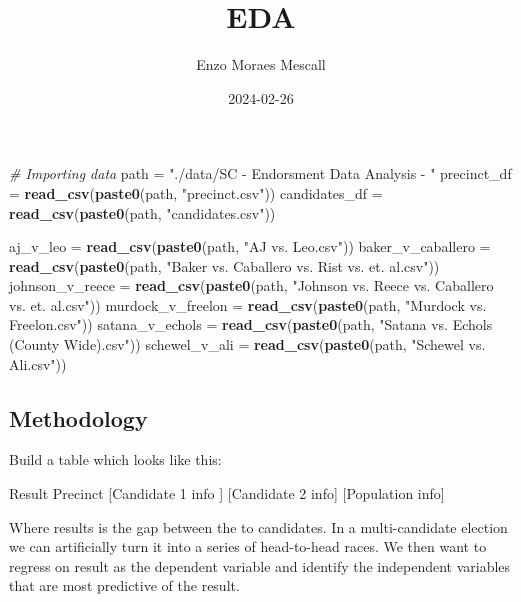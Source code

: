 \documentclass[
]{article}
\title{EDA}
\author{Enzo Moraes Mescall}
\date{2024-02-26}
\newenvironment{Shaded}{\begin{snugshade}}{\end{snugshade}}
\newcommand{\CommentTok}[1]{\textcolor[rgb]{0.56,0.35,0.01}{\textit{#1}}}
\newcommand{\FunctionTok}[1]{\textcolor[rgb]{0.13,0.29,0.53}{\textbf{#1}}}
\newcommand{\NormalTok}[1]{#1}
\newcommand{\OtherTok}[1]{\textcolor[rgb]{0.56,0.35,0.01}{#1}}
\newcommand{\StringTok}[1]{\textcolor[rgb]{0.31,0.60,0.02}{#1}}
\begin{document}
\maketitle

\begin{Shaded}
\begin{Highlighting}[]
\CommentTok{\# Importing data}
\NormalTok{path }\OtherTok{=} \StringTok{"./data/SC {-} Endorsment Data Analysis {-} "}
\NormalTok{precinct\_df }\OtherTok{=} \FunctionTok{read\_csv}\NormalTok{(}\FunctionTok{paste0}\NormalTok{(path, }\StringTok{"precinct.csv"}\NormalTok{))}
\NormalTok{candidates\_df }\OtherTok{=} \FunctionTok{read\_csv}\NormalTok{(}\FunctionTok{paste0}\NormalTok{(path, }\StringTok{"candidates.csv"}\NormalTok{))}

\NormalTok{aj\_v\_leo }\OtherTok{=} \FunctionTok{read\_csv}\NormalTok{(}\FunctionTok{paste0}\NormalTok{(path, }\StringTok{"AJ vs. Leo.csv"}\NormalTok{))}
\NormalTok{baker\_v\_caballero }\OtherTok{=} \FunctionTok{read\_csv}\NormalTok{(}\FunctionTok{paste0}\NormalTok{(path, }\StringTok{"Baker vs. Caballero vs. Rist vs. et. al.csv"}\NormalTok{))}
\NormalTok{johnson\_v\_reece }\OtherTok{=} \FunctionTok{read\_csv}\NormalTok{(}\FunctionTok{paste0}\NormalTok{(path, }\StringTok{"Johnson vs. Reece vs. Caballero vs. et. al.csv"}\NormalTok{))}
\NormalTok{murdock\_v\_freelon }\OtherTok{=} \FunctionTok{read\_csv}\NormalTok{(}\FunctionTok{paste0}\NormalTok{(path, }\StringTok{"Murdock vs. Freelon.csv"}\NormalTok{))}
\NormalTok{satana\_v\_echols }\OtherTok{=} \FunctionTok{read\_csv}\NormalTok{(}\FunctionTok{paste0}\NormalTok{(path, }\StringTok{"Satana vs. Echols (County Wide).csv"}\NormalTok{))}
\NormalTok{schewel\_v\_ali }\OtherTok{=} \FunctionTok{read\_csv}\NormalTok{(}\FunctionTok{paste0}\NormalTok{(path, }\StringTok{"Schewel vs. Ali.csv"}\NormalTok{))}
\end{Highlighting}
\end{Shaded}

\hypertarget{methodology}{%
\subsection{Methodology}\label{methodology}}

Build a table which looks like this:

Result \textbar{} Precinct \textbar{} {[}Candidate 1 info {]} \textbar{}
{[}Candidate 2 info{]} \textbar{} {[}Population info{]}

Where results is the gap between the to candidates. In a multi-candidate
election we can artificially turn it into a series of head-to-head
races. We then want to regress on result as the dependent variable and
identify the independent variables that are most predictive of the
result.
\end{document}

